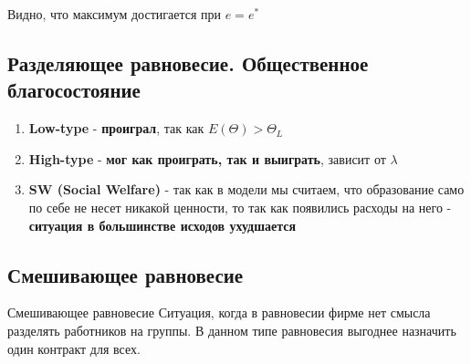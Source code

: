 \smallskip\indent\setlength{\parindent}{1em}Видно, что максимум достигается при $e=e^*$

\newpage

\subsection{Разделяющее равновесие. Общественное благосостояние}

\begin{enumerate}
    \item \textbf{Low-type} - \textbf{проиграл}, так как $E(\Theta)>\Theta_L$
    \item \textbf{High-type} - \textbf{мог как проиграть, так и выиграть}, зависит от $\lambda$
    \item \textbf{SW (Social Welfare)} - так как в модели мы считаем, что образование само по себе не несет никакой ценности, то так как появились расходы на него - \textbf{ситуация в большинстве исходов ухудшается}
\end{enumerate}

\subsection{Смешивающее равновесие}

\begin{mybox}{Смешивающее равновесие}
    Ситуация, когда в равновесии фирме нет смысла разделять работников на группы. В данном типе равновесия
    выгоднее назначить один контракт для всех.
\end{mybox}

